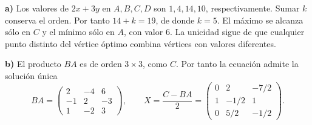 \textbf{a)} Los valores de $2x+3y$ en $A,B,C,D$ son $1,4,14,10$, respectivamente. Sumar $k$ conserva el orden. Por tanto $14+k=19$, de donde $\boxed{k=5}$. El máximo se alcanza sólo en $C$ y el mínimo sólo en $A$, con valor $6$. La unicidad sigue de que cualquier punto distinto del vértice óptimo combina vértices con valores diferentes.

\textbf{b)} El producto $BA$ es de orden $3\times3$, como $C$. Por tanto la ecuación admite la solución única
\[
BA=\begin{pmatrix}2&-4&6\\-1&2&-3\\1&-2&3\end{pmatrix},
\qquad
X=\frac{C-BA}{2}
=\boxed{\begin{pmatrix}0&2&-7/2\\1&-1/2&1\\0&5/2&-1/2\end{pmatrix}}.
\]
